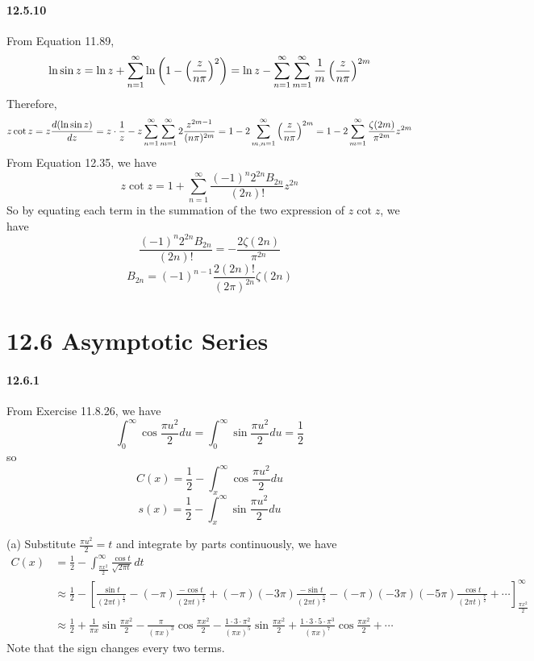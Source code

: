 \documentclass[a4paper]{article}
\begin{document}
\paragraph{12.5.10}
From Equation 11.89,
\[
\ln\sin z=\ln z+\sum_{n=1}^\infty\ln\left(1-\left(\frac{z}{n\pi}\right)^2 \right)=\ln z-\sum_{n=1}^\infty\sum_{m=1}^\infty\frac{1}{m}\left(\frac{z}{n\pi} \right)^{2m}
\]
Therefore,
\[
z\cot z=z\frac{d(\ln\sin z)}{dz}=z\cdot\frac{1}{z}-z\sum_{n=1}^\infty\sum_{m=1}^\infty2\frac{z^{2m-1}}{(n\pi)^{2m}}=1-2\sum_{m,n=1}^\infty\left(\frac{z}{n\pi} \right)^{2m}=1-2\sum_{m=1}^\infty\frac{\zeta(2m)}{\pi^{2m}}z^{2m}
\]
From Equation 12.35, we have
\[
z\cot z=1+\sum_{n=1}^\infty\frac{(-1)^n2^{2n}B_{2n}}{(2n)!}z^{2n}
\]
So by equating each term in the summation of the two expression of $z\cot z$, we have
\[
\frac{(-1)^n2^{2n}B_{2n}}{(2n)!}=-\frac{2\zeta(2n)}{\pi^{2n}}
\]
\[
B_{2n}=(-1)^{n-1}\frac{2(2n)!}{(2\pi)^{2n}}\zeta(2n)
\]

\section*{12.6 Asymptotic Series}

\paragraph{12.6.1}
From Exercise 11.8.26, we have
\[
\int_0^\infty\cos\frac{\pi u^2}{2}du=\int_0^\infty\sin\frac{\pi u^2}{2}du=\frac{1}{2}
\]
so
\[
C(x)=\frac{1}{2}-\int_x^\infty\cos\frac{\pi u^2}{2}du
\]
\[
s(x)=\frac{1}{2}-\int_x^\infty\sin\frac{\pi u^2}{2}du
\]

(a)
Substitute $\frac{\pi u^2}{2}=t$ and integrate by parts continuously, we have
\begin{equation*}
    \begin{split}
        C(x) & =\frac{1}{2}-\int_{\frac{\pi x^2}{2}}^\infty\frac{\cos t}{\sqrt{2\pi t}}\,dt\\
        & \approx\frac{1}{2}-\left[\frac{\sin t}{(2\pi t)^{\frac{1}{2}}}-(-\pi)\frac{-\cos t}{(2\pi t)^{\frac{3}{2}}}+(-\pi)(-3\pi)\frac{-\sin t}{(2\pi t)^{\frac{5}{2}}}-(-\pi)(-3\pi)(-5\pi)\frac{\cos t}{(2\pi t)^{\frac{7}{2}}}+\cdots \right]_{\frac{\pi x^2}{2}}^\infty\\
        &  \approx\frac{1}{2}+\frac{1}{\pi x}\sin\frac{\pi x^2}{2}-\frac{\pi}{(\pi x)^3}\cos\frac{\pi x^2}{2}-\frac{1\cdot3\cdot\pi^2}{(\pi x)^5}\sin\frac{\pi x^2}{2}+\frac{1\cdot3\cdot5\cdot\pi^3}{(\pi x)^7}\cos\frac{\pi x^2}{2}+\cdots
    \end{split}
\end{equation*}
Note that the sign changes every two terms.
\medskip
\end{document}
